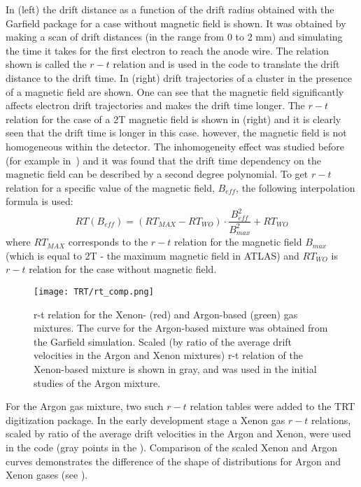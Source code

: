 In  (left) the drift distance as a function of the drift radius obtained with the Garfield package for a case without magnetic field is shown.
It was obtained by making a scan of drift distances (in the range from 0 to 2 mm) and simulating the time it takes for the first electron to reach the anode wire.
The relation shown is called the $r-t$ relation and is used in the code to translate the drift distance to the drift time.
In  (right) drift trajectories of a cluster in the presence of a magnetic field are shown. One can see that the magnetic field
significantly affects electron drift trajectories and makes the drift time longer. The $r-t$ relation for the case of a 2T magnetic field is shown
in  (right) and it is clearly seen that the drift time is longer in this case. however, the magnetic field is not homogeneous within the detector.
The inhomogeneity effect was studied before (for example in~\cite{esben_thesis}) and it was found that the drift time dependency on the magnetic field can be 
described by a second degree polynomial. 
To get $r-t$ relation for a specific value of the magnetic field, $B_{eff}$, the following interpolation formula is used:
\begin{displaymath}
    RT(B_{eff}) = (RT_{MAX} - RT_{WO}) \cdot \dfrac{B_{eff}^2}{B_{max}^2} + RT_{WO}
\end{displaymath}
where $RT_{MAX}$ corresponds to the $r-t$ relation for the magnetic field $B_{max}$ (which is equal to 2T - the maximum magnetic field in ATLAS) and $RT_{WO}$ is 
$r-t$ relation for the case without magnetic field.

\begin{figure}
\centering
 \texttt{[image: TRT/rt\_comp.png]}
\caption{r-t relation for the Xenon- (red) and Argon-based (green) gas mixtures. The curve for the Argon-based mixture was obtained from the Garfield simulation. 
Scaled (by ratio of the average drift velocities in the Argon and Xenon mixtures) 
r-t relation of the Xenon-based mixture is shown in gray, and was used in the initial studies of the Argon mixture.
}
\label{fig:rt_comp}
\end{figure}

For the Argon gas mixture, two such $r-t$ relation tables were added to the TRT digitization package.
In the early development stage a Xenon gas $r-t$ relations, scaled by ratio of the average drift velocities in the Argon and Xenon, were used in the code 
(gray points in the ). 
Comparison of the scaled Xenon and Argon curves demonstrates the difference of the shape of distributions for Argon and Xenon gases (see ).

